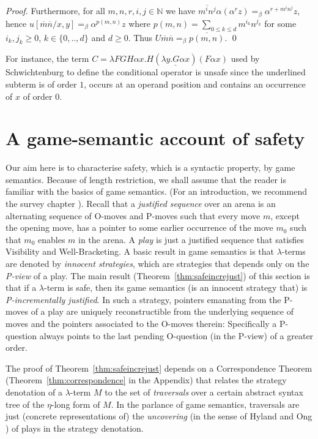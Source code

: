 \documentclass{llncs}
\newcommand{\encode}[1]{\overline{#1}} \newcommand\dps{\displaystyle}
\newcommand\nat{\mathbb{N}}
\begin{document}
\begin{proof}
Furthermore, for all $m,n,r,i,j\in \nat$
we have $\encode{m^i n^j} \alpha (\alpha^r z) =_\beta
\alpha^{r + m^i n^j} z$,
hence $u[\encode{m} \encode{n}/x,y] =_\beta \alpha^{p(m,n)} z$ where $p(m,n) = \sum_{0\leq k \leq d} m^{i_k} n^{j_k}$ for some $i_k,j_k \geq 0$, $k \in\{ 0,..,d \}$ and $d\geq 0$.
Thus $U \encode{m} \encode{n} =_\beta \encode{p(m,n)}$. \qed
\end{proof}

For instance, the term $ C = \lambda F G H \alpha x . H (
\underline{\lambda y . G \alpha x} ) (F \alpha x)$ used by
Schwichtenburg \cite{citeulike:622637} to define the conditional
operator is unsafe since the underlined subterm is of order $1$,
occurs at an operand position and contains an occurrence of $x$ of
order $0$.


\section{A game-semantic account of safety}
\label{sec:gamesemaccount}
Our aim here is to characterise safety, which is a syntactic property,
by game semantics. Because of length restriction, we shall assume that
the reader is familiar with the basics of game semantics.  (For an
introduction, we recommend the survey chapter
\cite{ghicamccusker00}). Recall that a \emph{justified sequence} over
an arena is an alternating sequence of O-moves and P-moves such that
every move $m$, except the opening move, has a pointer to some earlier
occurrence of the move $m_0$ such that $m_0$ enables $m$ in the
arena. A \emph{play} is just a justified sequence that satisfies
Visibility and Well-Bracketing. A basic result in game semantics is
that $\lambda$-terms are denoted by \emph{innocent strategies}, which
are strategies that depends only on the \emph{P-view} of a play. The
main result (Theorem~\ref{thm:safeincrejust}) of this section is that
if a $\lambda$-term is safe, then its game semantics (is an innocent
strategy that) is \emph{P-incrementally justified}. In such a
strategy, pointers emanating from the P-moves of a play are uniquely
reconstructible from the underlying sequence of moves and the pointers
associated to the O-moves therein: Specifically a P-question always
points to the last pending O-question (in the P-view) of a greater
order.

The proof of Theorem~\ref{thm:safeincrejust} depends on a
Correspondence Theorem (Theorem~\ref{thm:correspondence} in the
Appendix) that relates the strategy denotation of a $\lambda$-term $M$
to the set of \emph{traversals} over a certain abstract syntax tree of
the $\eta$-long form of $M$. In the parlance of game semantics,
traversals are just (concrete representations of) the
\emph{uncovering} (in the sense of Hyland and Ong
\cite{hylandong_pcf}) of plays in the strategy denotation.
\end{document}
